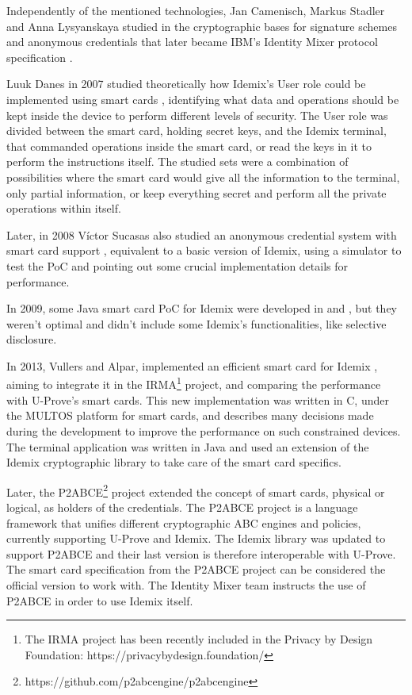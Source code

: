 \hfil

Independently of the mentioned technologies, Jan Camenisch, Markus Stadler and Anna Lysyanskaya studied in \cite{Camenisch:GroupSig,Camenisch:AnonCred,camenisch2002signature} 
the cryptographic bases for signature schemes and anonymous credentials that later became IBM's Identity Mixer protocol specification \cite{idemixSpec}.


Luuk Danes in 2007 studied theoretically how Idemix's User role could be implemented using  
smart cards \cite{luuk}, identifying what data and operations should be kept inside the device to perform different levels of security. The User role was divided between the smart card, holding secret keys, and the Idemix terminal, that commanded operations inside the smart card, or read the keys in it to perform the instructions itself. The studied sets were a combination of possibilities where the smart card would give all the information to the terminal, only partial information, or keep everything secret and perform all the private operations within itself.

Later, in 2008 V\'ictor Sucasas also studied an anonymous credential system with smart card support \cite{sucasas}, equivalent to a basic version of Idemix, using a simulator to test the PoC and pointing out some crucial implementation details for performance.

In 2009, some Java smart card PoC for Idemix were developed in \cite{javaIdemix1} and \cite{javaIdemix2}, but they weren't optimal and didn't include some Idemix's functionalities, like selective disclosure.

In 2013, Vullers and Alpar, implemented an efficient smart card for Idemix \cite{vullers2013efficient}, aiming to integrate it in the IRMA\footnote{The IRMA project has been recently included in the Privacy by Design Foundation: {https://privacybydesign.foundation/}} project, and comparing the performance with U-Prove's smart cards. This new implementation was written in C, under the MULTOS platform for smart cards, and describes many decisions made during the development to improve the performance on such constrained devices. The terminal application was written in Java and used an extension of the Idemix cryptographic library to take care of the smart card specifics.


Later, the P2ABCE\footnote{{https://github.com/p2abcengine/p2abcengine}} project extended the concept of smart cards, physical or logical, as holders of the credentials.  The P2ABCE project is a language framework that unifies different cryptographic ABC engines and policies, currently supporting U-Prove and Idemix. The Idemix library was updated to support P2ABCE and their last version is therefore interoperable with U-Prove. The smart card specification from the P2ABCE project can be considered the official version to work with. The Identity Mixer team instructs the use of P2ABCE in order to use Idemix itself.


